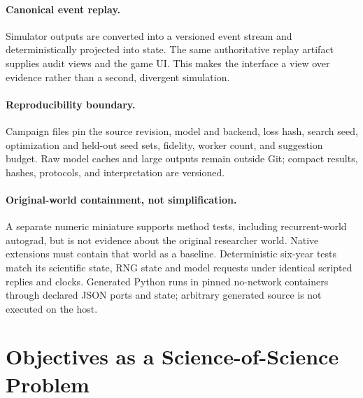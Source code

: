 \documentclass{article}
\begin{document}
\paragraph{Canonical event replay.} Simulator outputs are converted into a versioned event stream and deterministically projected into state. The same authoritative replay artifact supplies audit views and the game UI. This makes the interface a view over evidence rather than a second, divergent simulation.

\paragraph{Reproducibility boundary.} Campaign files pin the source revision, model and backend, loss hash, search seed, optimization and held-out seed sets, fidelity, worker count, and suggestion budget. Raw model caches and large outputs remain outside Git; compact results, hashes, protocols, and interpretation are versioned.

\paragraph{Original-world containment, not simplification.} A separate numeric miniature supports method tests, including recurrent-world autograd, but is not evidence about the original researcher world. Native extensions must contain that world as a baseline. Deterministic six-year tests match its scientific state, RNG state and model requests under identical scripted replies and clocks. Generated Python runs in pinned no-network containers through declared JSON ports and state; arbitrary generated source is not executed on the host.



\FloatBarrier









\FloatBarrier

\FloatBarrier


\FloatBarrier

\section{Objectives as a Science-of-Science Problem}
\end{document}
